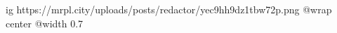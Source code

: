  
 
 
 
 

\ifcmt
  ig https://mrpl.city/uploads/posts/redactor/yec9hh9dz1tbw72p.png
  @wrap center
  @width 0.7
\fi
